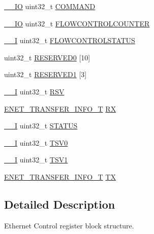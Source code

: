 \begin{DoxyCompactItemize}
\item 
\hyperlink{core__cm3_8h_aec43007d9998a0a0e01faede4133d6be}{\+\_\+\+\_\+\+IO} uint32\+\_\+t \hyperlink{structENET__CONTROL__T_a5c6633c6ca37621d5f23513ebca2bd17}{C\+O\+M\+M\+A\+ND}
\item 
\hyperlink{core__cm3_8h_aec43007d9998a0a0e01faede4133d6be}{\+\_\+\+\_\+\+IO} uint32\+\_\+t \hyperlink{structENET__CONTROL__T_a988aac51d07bd4d330945f74f3747084}{F\+L\+O\+W\+C\+O\+N\+T\+R\+O\+L\+C\+O\+U\+N\+T\+ER}
\item 
\hyperlink{core__cm3_8h_af63697ed9952cc71e1225efe205f6cd3}{\+\_\+\+\_\+I} uint32\+\_\+t \hyperlink{structENET__CONTROL__T_abe816b0eaea3b8dcb126cbe565d81ffb}{F\+L\+O\+W\+C\+O\+N\+T\+R\+O\+L\+S\+T\+A\+T\+US}
\item 
uint32\+\_\+t \hyperlink{structENET__CONTROL__T_a662f1911bc2db756493ef2dd77e83be5}{R\+E\+S\+E\+R\+V\+E\+D0} \mbox{[}10\mbox{]}
\item 
uint32\+\_\+t \hyperlink{structENET__CONTROL__T_a83f993318d9638ea36fa88d8f5bcb957}{R\+E\+S\+E\+R\+V\+E\+D1} \mbox{[}3\mbox{]}
\item 
\hyperlink{core__cm3_8h_af63697ed9952cc71e1225efe205f6cd3}{\+\_\+\+\_\+I} uint32\+\_\+t \hyperlink{structENET__CONTROL__T_a5817f844b6195193d1536edbc770e72f}{R\+SV}
\item 
\hyperlink{structENET__TRANSFER__INFO__T}{E\+N\+E\+T\+\_\+\+T\+R\+A\+N\+S\+F\+E\+R\+\_\+\+I\+N\+F\+O\+\_\+T} \hyperlink{structENET__CONTROL__T_a3b07c9a812059f852415f8b5a5261882}{RX}
\item 
\hyperlink{core__cm3_8h_af63697ed9952cc71e1225efe205f6cd3}{\+\_\+\+\_\+I} uint32\+\_\+t \hyperlink{structENET__CONTROL__T_aaaef8a4b3d2a27e488d5e2e8a236640a}{S\+T\+A\+T\+US}
\item 
\hyperlink{core__cm3_8h_af63697ed9952cc71e1225efe205f6cd3}{\+\_\+\+\_\+I} uint32\+\_\+t \hyperlink{structENET__CONTROL__T_adfd0bf0a173cb107271eba4fa8f20de8}{T\+S\+V0}
\item 
\hyperlink{core__cm3_8h_af63697ed9952cc71e1225efe205f6cd3}{\+\_\+\+\_\+I} uint32\+\_\+t \hyperlink{structENET__CONTROL__T_a03b03ad79457f3f25cc3d1d2d564310a}{T\+S\+V1}
\item 
\hyperlink{structENET__TRANSFER__INFO__T}{E\+N\+E\+T\+\_\+\+T\+R\+A\+N\+S\+F\+E\+R\+\_\+\+I\+N\+F\+O\+\_\+T} \hyperlink{structENET__CONTROL__T_a1010eaf24cd6af0d6355b4cd34d8e90a}{TX}
\end{DoxyCompactItemize}


\subsection{Detailed Description}
Ethernet Control register block structure. 

